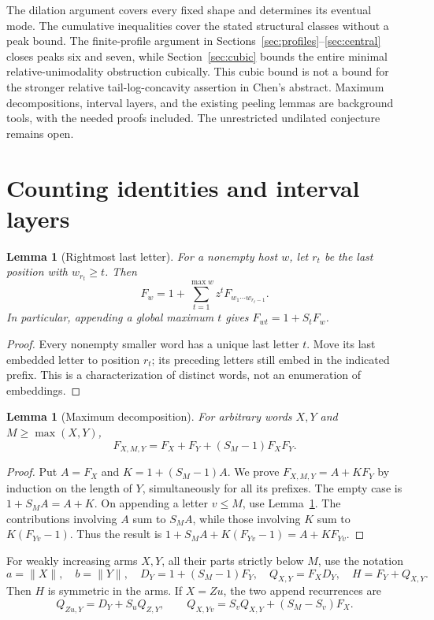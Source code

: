 \documentclass[11pt]{article}
\newtheorem{lemma}[theorem]{Lemma}
\theoremstyle{remark}\newtheorem{remark}[theorem]{Remark}
\newcommand{\wt}[1]{\lVert #1\rVert}
\begin{document}
The dilation argument covers every fixed shape and determines its eventual mode. The cumulative inequalities cover the stated structural classes without a peak bound. The finite-profile argument in Sections~\ref{sec:profiles}--\ref{sec:central} closes peaks six and seven, while Section~\ref{sec:cubic} bounds the entire minimal relative-unimodality obstruction cubically. This cubic bound is not a bound for the stronger relative tail-log-concavity assertion in Chen's abstract. Maximum decompositions, interval layers, and the existing peeling lemmas are background tools, with the needed proofs included. The unrestricted undilated conjecture remains open.

\section{Counting identities and interval layers}\label{sec:basic}
\begin{lemma}[Rightmost last letter]\label{lem:last}
For a nonempty host $w$, let $r_t$ be the last position with $w_{r_t}\ge t$. Then
\[
 F_w=1+\sum_{t=1}^{\max w}z^tF_{w_1\cdots w_{r_t-1}}.
\]
In particular, appending a global maximum $t$ gives $F_{wt}=1+S_tF_w$.
\end{lemma}
\begin{proof}
Every nonempty smaller word has a unique last letter $t$. Move its last embedded letter to position $r_t$; its preceding letters still embed in the indicated prefix. This is a characterization of distinct words, not an enumeration of embeddings.
\end{proof}

\begin{lemma}[Maximum decomposition]\label{lem:core}
For arbitrary words $X,Y$ and $M\ge\max(X,Y)$,
\begin{equation}\label{eq:core}
 F_{X,M,Y}=F_X+F_Y+(S_M-1)F_XF_Y.
\end{equation}
\end{lemma}
\begin{proof}
Put $A=F_X$ and $K=1+(S_M-1)A$. We prove $F_{X,M,Y}=A+KF_Y$ by induction on the length of $Y$, simultaneously for all its prefixes. The empty case is $1+S_MA=A+K$. On appending a letter $v\le M$, use Lemma~\ref{lem:last}. The contributions involving $A$ sum to $S_MA$, while those involving $K$ sum to $K(F_{Yv}-1)$. Thus the result is $1+S_MA+K(F_{Yv}-1)=A+KF_{Yv}$.
\end{proof}

For weakly increasing arms $X,Y$, all their parts strictly below $M$, use the notation
\begin{equation}\label{eq:notation}
 a=\wt X,\quad b=\wt Y,\quad D_Y=1+(S_M-1)F_Y,
 \quad Q_{X,Y}=F_XD_Y,\quad H=F_Y+Q_{X,Y}.
\end{equation}
Then $H$ is symmetric in the arms. If $X=Zu$, the two append recurrences are
\begin{equation}\label{eq:qappend}
 Q_{Zu,Y}=D_Y+S_uQ_{Z,Y},\qquad
 Q_{X,Yv}=S_vQ_{X,Y}+(S_M-S_v)F_X.
\end{equation}
\end{document}
